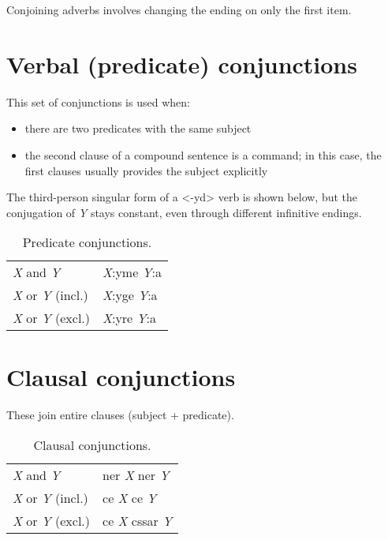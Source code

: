 \documentclass{book}
\begin{document}
Conjoining adverbs involves changing the ending on only the first item.

\section{Verbal (predicate) conjunctions}

This set of conjunctions is used when:

\begin{itemize}
	\item there are two predicates with the same subject
	\item the second clause of a compound sentence is a command; in this case, the first clauses usually provides the subject explicitly
\end{itemize}

The third-person singular form of a <-yd> verb is shown below, but the conjugation of \emph{Y} stays constant, even through different infinitive endings.

\begin{table}[ht]
  \caption{Predicate conjunctions.}
  \centering
	\begin{tabular}{|l|l|}
	  \hline
	  \emph{X} and \emph{Y} & \emph{X}:yme \emph{Y}:a \\
	  \emph{X} or \emph{Y} (incl.) & \emph{X}:yge \emph{Y}:a \\
	  \emph{X} or \emph{Y} (excl.) & \emph{X}:yre \emph{Y}:a \\ \hline
	\end{tabular}
\end{table}

\section{Clausal conjunctions}

These join entire clauses (subject + predicate).

\begin{table}[ht]
  \caption{Clausal conjunctions.}
  \centering
	\begin{tabular}{|l|l|}
	  \hline
	  \emph{X} and \emph{Y} & ner \emph{X} ner \emph{Y} \\
	  \emph{X} or \emph{Y} (incl.) & ce \emph{X} ce \emph{Y} \\
	  \emph{X} or \emph{Y} (excl.) & ce \emph{X} cssar \emph{Y} \\ \hline
	\end{tabular}
\end{table}
\end{document}
